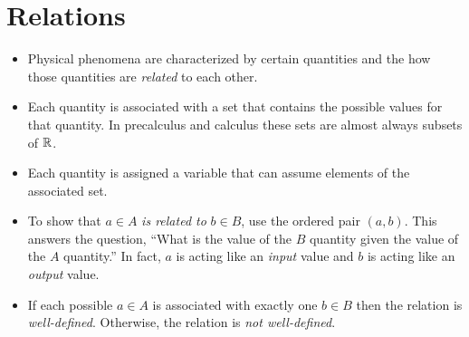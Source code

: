 \documentclass[letterpaper,12pt,fleqn]{article}
\begin{document}
\section*{Relations}

\begin{itemize}[left=0in]

\item Physical phenomena are characterized by certain quantities and the how those quantities are \emph{related} to
  each other.

\item Each quantity is associated with a set that contains the possible values for that quantity.  In precalculus
  and calculus these sets are almost always subsets of \(\mathbb{R}\).

\item Each quantity is assigned a variable that can assume elements of the associated set.

\item To show that \(a\in A\) \emph{is related to} \(b\in B\), use the ordered pair \((a,b)\).  This answers the
  question, ``What is the value of the \(B\) quantity given the value of the \(A\) quantity.''  In fact, \(a\) is
  acting like an \emph{input} value and \(b\) is acting like an \emph{output} value.

\item If each possible \(a\in A\) is associated with exactly one \(b\in B\) then the relation is
  \emph{well-defined}.  Otherwise, the relation is \emph{not well-defined}.
\end{itemize}
\end{document}

